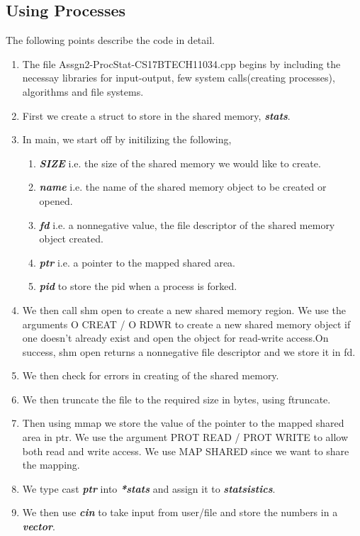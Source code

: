 \documentclass[a4paper,12pt]{report}
\begin{document}
\subsection*{Using Processes}
The following points describe the code in detail.\\
\begin{enumerate}
\item The file Assgn2-ProcStat-CS17BTECH11034.cpp begins by including the
necessay libraries for input-output, few system calls(creating processes), algorithms and file systems.
\item First we create a struct to store in the shared memory, \textbf{\textit{stats}}.
\item In main, we start off by initilizing the following,
\begin{enumerate}
\item \textbf{\textit{SIZE}} i.e. the size of the shared memory we would like to create.
\item \textit{\textbf{name}} i.e. the name of the shared memory object to be created
or opened.
\item \textit{\textbf{fd}} i.e. a nonnegative value, the file descriptor of the shared memory object created.
\item \textit{\textbf{ptr}} i.e. a pointer to the mapped shared area.
\item \textit{\textbf{pid}} to store the pid when a process is forked.
\end{enumerate}
\item We then call shm open to create a new shared memory region. We
use the arguments O CREAT / O RDWR to create a new shared
memory object if one doesn’t already exist and open the object for
read-write access.On success, shm open returns a nonnegative file descriptor and we store it in fd.
\item We then check for errors in creating of the shared memory.
\item We then truncate the file to the required size in bytes, using ftruncate.
\item Then using mmap we store the value of the pointer to the mapped
shared area in ptr. We use the argument PROT READ / PROT WRITE
to allow both read and write access. We use MAP SHARED since
we want to share the mapping.
\item We type cast \textbf{\textit{ptr}} into \textbf{\textit{*stats}} and assign it to \textbf{\textit{statsistics}}.
\item We then use \textbf{\textit{cin}} to take input from user/file and store the numbers in a \textbf{\textit{vector}}.

\end{enumerate}
\end{document}
